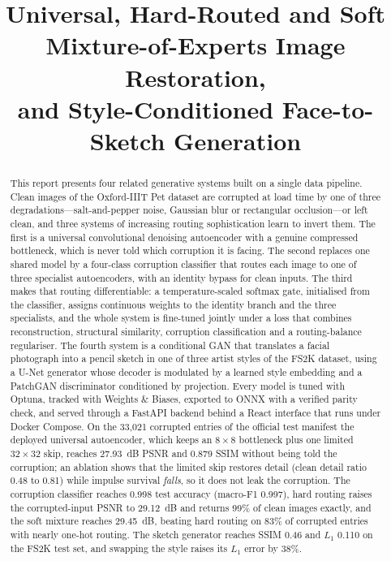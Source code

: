 \documentclass[conference]{IEEEtran}
\begin{document}
\title{Universal, Hard-Routed and Soft Mixture-of-Experts Image Restoration,\\
and Style-Conditioned Face-to-Sketch Generation}

\author{
}

\maketitle

\begin{abstract}
This report presents four related generative systems built on a single data
pipeline. Clean images of the Oxford-IIIT Pet dataset are corrupted at load time
by one of three degradations---salt-and-pepper noise, Gaussian blur or
rectangular occlusion---or left clean, and three systems of increasing routing
sophistication learn to invert them. The first is a universal convolutional
denoising autoencoder with a genuine compressed bottleneck, which is never told
which corruption it is facing. The second replaces one shared model by a
four-class corruption classifier that routes each image to one of three
specialist autoencoders, with an identity bypass for clean inputs. The third
makes that routing differentiable: a temperature-scaled softmax gate, initialised
from the classifier, assigns continuous weights to the identity branch and the
three specialists, and the whole system is fine-tuned jointly under a loss that
combines reconstruction, structural similarity, corruption classification and a
routing-balance regulariser. The fourth system is a conditional GAN that
translates a facial photograph into a pencil sketch in one of three artist
styles of the FS2K dataset, using a U-Net generator whose decoder is modulated by
a learned style embedding and a PatchGAN discriminator conditioned by projection.
Every model is tuned with Optuna, tracked with Weights \& Biases, exported to
ONNX with a verified parity check, and served through a FastAPI backend behind a
React interface that runs under Docker Compose.
On the 33{,}021 corrupted entries of the official test manifest the deployed
universal autoencoder, which keeps an $8\times8$ bottleneck plus one limited
$32\times32$ skip, reaches 27.93~dB PSNR and 0.879 SSIM without being told the
corruption; an ablation shows that the limited skip restores detail (clean detail
ratio 0.48 to 0.81) while impulse survival \emph{falls}, so it does not leak the
corruption. The corruption classifier reaches 0.998 test accuracy (macro-F1
0.997), hard routing raises the corrupted-input PSNR to 29.12~dB and returns
99\% of clean images exactly, and the soft mixture reaches 29.45~dB, beating hard
routing on 83\% of corrupted entries with nearly one-hot routing. The sketch
generator reaches SSIM 0.46 and $L_1$ 0.110 on the FS2K test set, and swapping the
style raises its $L_1$ error by 38\%.
\end{abstract}
\end{document}
